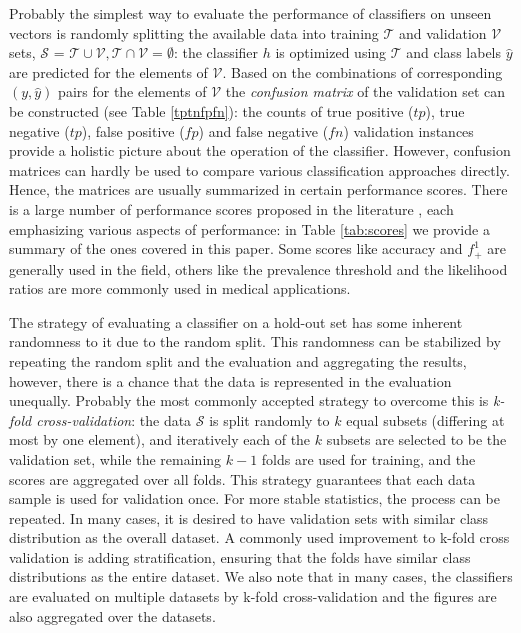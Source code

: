 \documentclass[5p, final]{elsarticle}
\begin{document}
Probably the simplest way to evaluate the performance of classifiers on unseen vectors is randomly splitting the available data into training $\mathcal{T}$ and validation $\mathcal{V}$ sets, $\mathcal{S}$ = $\mathcal{T} \cup \mathcal{V}, \mathcal{T} \cap \mathcal{V} = \emptyset$: the classifier $h$ is optimized using $\mathcal{T}$ and class labels $\hat{y}$ are predicted for the elements of $\mathcal{V}$. 
Based on the combinations of corresponding $(y, \hat{y})$ pairs for the elements of $\mathcal{V}$ the \emph{confusion matrix} of the validation set can be constructed (see Table \ref{tptnfpfn}): the counts of true positive ($tp$), true negative ($tp$), false positive ($fp$) and false negative ($fn$) validation instances provide a holistic picture about the operation of the classifier. However, confusion matrices can hardly be used to compare various classification approaches directly. Hence, the matrices are usually summarized in certain performance scores. There is a large number of performance scores proposed in the literature \cite{scores}, each emphasizing various aspects of performance: in Table \ref{tab:scores} we provide a summary of the ones covered in this paper. Some scores like accuracy and $f^1_{+}$ are generally used in the field, others like the prevalence threshold and the likelihood ratios are more commonly used in medical applications.

The strategy of evaluating a classifier on a hold-out set has some inherent randomness to it due to the random split. This randomness can be stabilized by repeating the random split and the evaluation and aggregating the results, however, there is a chance that the data is represented in the evaluation unequally. Probably the most commonly accepted strategy to overcome this is \emph{k-fold cross-validation}: the data $\mathcal{S}$ is split randomly to $k$ equal subsets (differing at most by one element), and iteratively each of the $k$ subsets are selected to be the validation set, while the remaining $k-1$ folds are used for training, and the scores are aggregated over all folds. This strategy guarantees that each data sample is used for validation once. For more stable statistics, the process can be repeated. In many cases, it is desired to have validation sets with similar class distribution as the overall dataset. A commonly used improvement to k-fold cross validation is adding stratification, ensuring that the folds have similar class distributions as the entire dataset. We also note that in many cases, the classifiers are evaluated on multiple datasets by k-fold cross-validation and the figures are also aggregated over the datasets.
\end{document}
